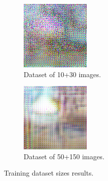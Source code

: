 \documentclass[twocolumn,superscriptaddress,aps,floatfix,nofootinbib]{revtex4-1}
\begin{document}
    \begin{figure}[ht!]
        \centering
        \begin{subfigure}[b]{0.22\textwidth}
            \centering
            \includegraphics[width=\textwidth]{resources/png/gan-results/inc1030.png}
            \caption{Dataset of 10+30 images.}
        \end{subfigure}
        \hfill
        \begin{subfigure}[b]{0.22\textwidth}
            \centering
            \includegraphics[width=\textwidth]{resources/png/gan-results/inc50150.png}
            \caption{Dataset of 50+150 images.}
            \label{fig:trainingsizes}
        \end{subfigure}
        \caption{Training dataset sizes results.}
    \end{figure}
    
\end{document}
